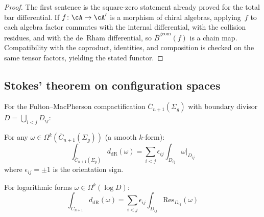 \begin{proof}
The first sentence is the square-zero statement already proved for the
total bar differential. If
$f \colon \cA \to \cA'$ is a morphism of chiral algebras, applying~$f$
to each algebra factor commutes with the internal differential, with
the collision residues, and with the de~Rham differential, so
$\bar B^{\mathrm{geom}}(f)$ is a chain map. Compatibility with the
coproduct, identities, and composition is checked on the same tensor
factors, yielding the stated functor.
\end{proof}

\subsection{Stokes' theorem on configuration spaces}

\begin{theorem}\label{thm:stokes-config}
For the Fulton--MacPherson compactification $\overline{C}_{n+1}(\Sigma_g)$ with boundary divisor $D = \bigcup_{i<j} D_{ij}$:

For any $\omega \in \Omega^k(\overline{C}_{n+1}(\Sigma_g))$ (a smooth $k$-form):
\[\int_{\overline{C}_{n+1}(\Sigma_g)} d_{\text{dR}}(\omega) = \sum_{i<j} \epsilon_{ij} \int_{D_{ij}} \omega|_{D_{ij}}\]
where $\epsilon_{ij} = \pm 1$ is the orientation sign.

For logarithmic forms $\omega \in \Omega^k(\log D)$:
\[\int_{\overline{C}_{n+1}} d_{\text{dR}}(\omega) = \sum_{i<j} \epsilon_{ij} \int_{D_{ij}} \text{Res}_{D_{ij}}(\omega)\]
\end{theorem}

